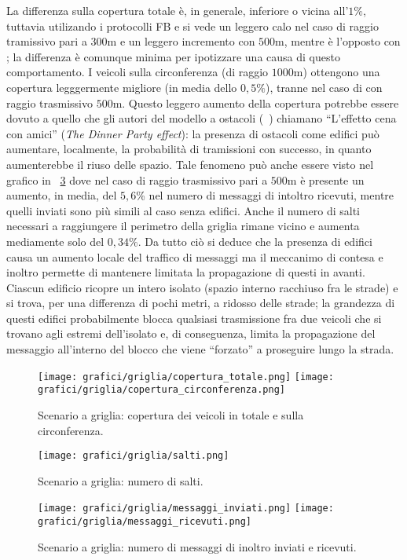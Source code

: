 La differenza sulla copertura totale è, in generale, inferiore o vicina all'$1\%$, tuttavia utilizando i protocolli FB e \statica{} si vede
un leggero calo nel caso di raggio tramissivo pari a $300$m e un leggero incremento con $500$m, mentre
è l'opposto con \staticb{}; la differenza è comunque minima per ipotizzare una causa di questo comportamento. %
I veicoli sulla circonferenza (di raggio $1000$m) ottengono una copertura legggermente migliore
(in media dello $0,5\%$), tranne nel caso di \staticb{} con raggio trasmissivo $500$m.
Questo leggero aumento della copertura potrebbe essere dovuto a quello che gli autori del modello a ostacoli (~\cite{Carpenter:2015:OMI:2756509.2756512})
chiamano ``L'effetto cena con amici'' (\textit{The Dinner Party effect}): la presenza di ostacoli come edifici
può aumentare, localmente, la probabilità di tramissioni con successo, in quanto aumenterebbe il riuso delle spazio.
Tale fenomeno può anche essere visto nel grafico in \figurename~\ref{fig:risultati-griglia-messaggi}
dove nel caso di raggio trasmissivo pari a $500$m è presente un aumento, in media, del $5,6$\%
nel numero di messaggi di intoltro ricevuti, mentre quelli inviati sono più simili al caso senza edifici.
Anche il numero di salti necessari a raggiungere il perimetro della griglia rimane vicino
e aumenta mediamente solo del $0,34\%$.
Da tutto ciò si deduce che la presenza di edifici causa un aumento locale del traffico di messaggi
ma il meccanimo di contesa e inoltro permette di mantenere limitata la propagazione di questi in avanti. %
Ciascun edificio ricopre un intero isolato (spazio interno racchiuso fra le strade) e si trova, per una differenza di pochi metri,
a ridosso delle strade;
la grandezza di questi edifici probabilmente blocca qualsiasi trasmissione fra due veicoli che si trovano
agli estremi dell'isolato e, di conseguenza, limita la propagazione del messaggio all'interno del blocco  che viene ``forzato''
a proseguire lungo la strada.
%
\begin{figure}[htbp]
	\centering
		\texttt{[image: grafici/griglia/copertura\_totale.png]}
		\texttt{[image: grafici/griglia/copertura\_circonferenza.png]}
\caption{Scenario a griglia: copertura dei veicoli in totale e sulla circonferenza.\label{fig:risultati-griglia-copertura}}
\end{figure}
%
\begin{figure}[htbp]
	\centering
		\texttt{[image: grafici/griglia/salti.png]}
\caption{Scenario a griglia: numero di salti.\label{fig:risultati-griglia-salti}}
\end{figure}
%
\begin{figure}[htbp]
	\centering
		\texttt{[image: grafici/griglia/messaggi\_inviati.png]}
		\texttt{[image: grafici/griglia/messaggi\_ricevuti.png]}
\caption{Scenario a griglia: numero di messaggi di inoltro inviati e ricevuti.\label{fig:risultati-griglia-messaggi}}
\end{figure}
\clearpage
%
%
